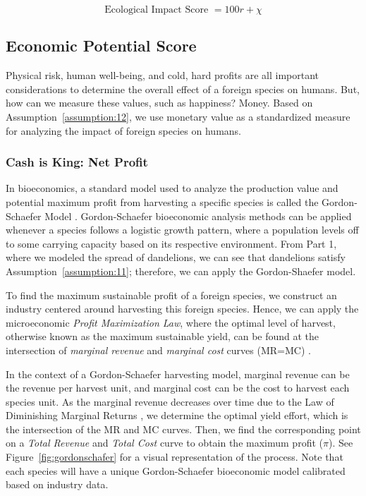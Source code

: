 \begin{equation}
    \text{Ecological Impact Score } = 100r + \chi
    \label{eq:ecologicalimpact}
\end{equation}

\subsection{Economic Potential Score}
Physical risk, human well-being, and cold, hard profits are all important considerations to determine the overall effect of a foreign species on humans. But, how can we measure these values, such as happiness? Money. Based on Assumption~\ref{assumption:12}, we use monetary value as a standardized measure for analyzing the impact of foreign species on humans.

\subsubsection{Cash is King: Net Profit}

In bioeconomics, a standard model used to analyze the production value and potential maximum profit from harvesting a specific species is called the Gordon-Schaefer Model \cite{wikipediaGordonSchaeferModel}. Gordon-Schaefer bioeconomic analysis methods can be applied whenever a species follows a logistic growth pattern, where a population levels off to some carrying capacity based on its respective environment. From Part 1, where we modeled the spread of dandelions, we can see that dandelions satisfy Assumption~\ref{assumption:11}; therefore, we can apply the Gordon-Shaefer model.

To find the maximum sustainable profit of a foreign species, we construct an industry centered around harvesting this foreign species. Hence, we can apply the microeconomic \textit{Profit Maximization Law}, where the optimal level of harvest, otherwise known as the maximum sustainable yield, can be found at the intersection of \textit{marginal revenue} and \textit{marginal cost} curves (MR=MC) \cite{intelligenteconomistProfitMaximization}.

In the context of a Gordon-Schaefer harvesting model, marginal revenue can be the revenue per harvest unit, and marginal cost can be the cost to harvest each species unit. As the marginal revenue decreases over time due to the Law of Diminishing Marginal Returns \cite{investopediaDiminishingMarginal}, we determine the optimal yield effort, which is the intersection of the MR and MC curves. Then, we find the corresponding point on a \textit{Total Revenue} and \textit{Total Cost} curve to obtain the maximum profit (\(\pi\)). See Figure~\ref{fig:gordonschafer} for a visual representation of the process. Note that each species will have a unique Gordon-Schaefer bioeconomic model calibrated based on industry data.

